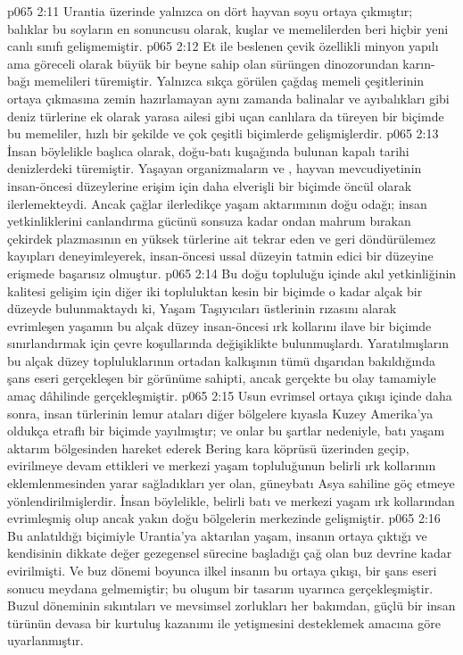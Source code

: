 \vs p065 2:11 Urantia üzerinde yalnızca on dört hayvan soyu ortaya çıkmıştır; balıklar bu soyların en sonuncusu olarak, kuşlar ve memelilerden beri hiçbir yeni canlı sınıfı gelişmemiştir.
\vs p065 2:12 Et ile beslenen çevik özellikli minyon yapılı ama göreceli olarak büyük bir beyne sahip olan sürüngen dinozorundan karın\hyp{}bağı memelileri  türemiştir. Yalnızca sıkça görülen çağdaş memeli çeşitlerinin ortaya çıkmasına zemin hazırlamayan aynı zamanda balinalar ve ayıbalıkları gibi deniz türlerine ek olarak yarasa ailesi gibi uçan canlılara da türeyen bir biçimde bu memeliler, hızlı bir şekilde ve çok çeşitli biçimlerde gelişmişlerdir.
\vs p065 2:13 İnsan böylelikle başlıca olarak, doğu\hyp{}batı kuşağında bulunan kapalı tarihi denizlerdeki  türemiştir. Yaşayan organizmaların  ve  , hayvan mevcudiyetinin insan\hyp{}öncesi düzeylerine erişim için daha elverişli bir biçimde öncül olarak ilerlemekteydi. Ancak çağlar ilerledikçe yaşam aktarımının doğu odağı; insan yetkinliklerini canlandırma gücünü sonsuza kadar ondan mahrum bırakan çekirdek plazmasının en yüksek türlerine ait tekrar eden ve geri döndürülemez kayıpları deneyimleyerek, insan\hyp{}öncesi ussal düzeyin tatmin edici bir düzeyine erişmede başarısız olmuştur.
\vs p065 2:14 Bu doğu topluluğu içinde akıl yetkinliğinin kalitesi gelişim için diğer iki topluluktan kesin bir biçimde o kadar alçak bir düzeyde bulunmaktaydı ki, Yaşam Taşıyıcıları üstlerinin rızasını alarak evrimleşen yaşamın bu alçak düzey insan\hyp{}öncesi ırk kollarını ilave bir biçimde sınırlandırmak için çevre koşullarında değişiklikte bulunmuşlardı. Yaratılmışların bu alçak düzey topluluklarının ortadan kalkışının tümü dışarıdan bakıldığında şans eseri gerçekleşen bir görünüme sahipti, ancak gerçekte bu olay tamamiyle amaç dâhilinde gerçekleşmiştir.
\vs p065 2:15 Usun evrimsel ortaya çıkışı içinde daha sonra, insan türlerinin lemur ataları diğer bölgelere kıyasla Kuzey Amerika’ya oldukça etraflı bir biçimde yayılmıştır; ve onlar bu şartlar nedeniyle, batı yaşam aktarım bölgesinden hareket ederek Bering kara köprüsü üzerinden geçip, evirilmeye devam ettikleri ve merkezi yaşam topluluğunun belirli ırk kollarının eklemlenmesinden yarar sağladıkları yer olan, güneybatı Asya sahiline göç etmeye yönlendirilmişlerdir. İnsan böylelikle, belirli batı ve merkezi yaşam ırk kollarından evrimleşmiş olup ancak yakın doğu bölgelerin merkezinde gelişmiştir.
\vs p065 2:16 Bu anlatıldığı biçimiyle Urantia’ya aktarılan yaşam, insanın ortaya çıktığı ve kendisinin dikkate değer gezegensel sürecine başladığı çağ olan buz devrine kadar evirilmişti. Ve buz dönemi boyunca ilkel insanın bu ortaya çıkışı, bir şans eseri sonucu meydana gelmemiştir; bu oluşum bir tasarım uyarınca gerçekleşmiştir. Buzul döneminin sıkıntıları ve mevsimsel zorlukları her bakımdan, güçlü bir insan türünün devasa bir kurtuluş kazanımı ile yetişmesini desteklemek amacına göre uyarlanmıştır.
